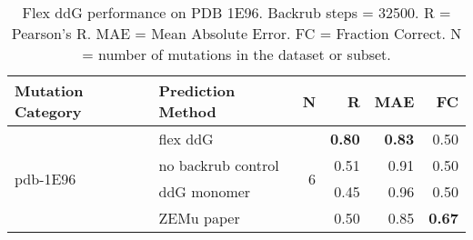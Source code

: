 \begin{table}
  \begin{tabular}{llrrrr}
\toprule
Mutation Category &   Prediction Method &  N &    R &  MAE &   FC \\
\midrule
 \multirow{ 4}{*}{pdb-1E96} & flex ddG & \multirow{ 4}{*}{6} & \textbf{0.80} & \textbf{0.83} & 0.50  \\
 & no backrub control & & 0.51 & 0.91 & 0.50  \\
 & ddG monomer & & 0.45 & 0.96 & 0.50  \\
 & ZEMu paper & & 0.50 & 0.85 & \textbf{0.67}  \\
\bottomrule
\end{tabular}
  \caption[Flex ddG performance on PDB 1E96]{
    Flex ddG performance on PDB 1E96. Backrub steps = 32500. R = Pearson's R. MAE = Mean Absolute Error. FC = Fraction Correct. N = number of mutations in the dataset or subset.
  } \label{tab:table-pdb-1E96}
\end{table}
